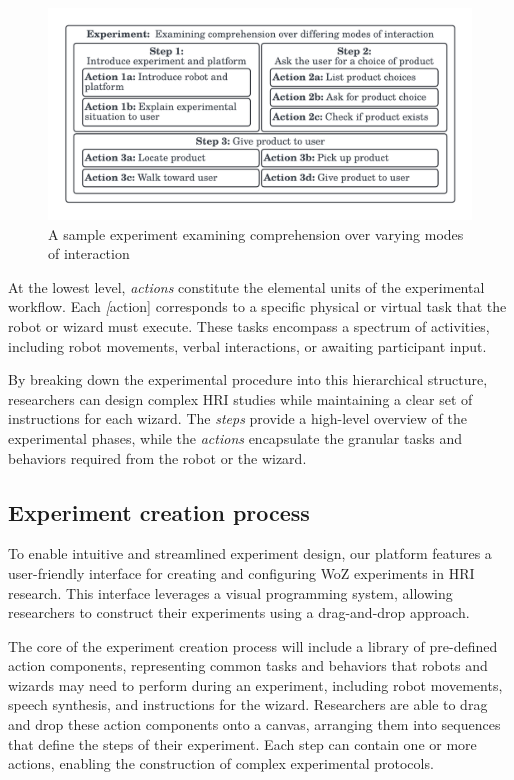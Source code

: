 \documentclass[letterpaper, 10 pt, conference]{ieeeconf}
\begin{document}
\begin{figure}[ht]
   \vskip -0.3cm
    \begin{center}
        \includegraphics[width=0.4\paperwidth]{assets/diagrams/experimentalarchitecture}
        \vskip -0.5cm
        \caption{A sample experiment examining comprehension over varying modes of interaction}
        \label{experimentalarchitecture}
    \end{center}
\vskip -0.3cm
\end{figure}

At the lowest level, \textit{actions} constitute the elemental units of the experimental workflow. Each \textit[action] corresponds to a specific physical or virtual task that the robot or wizard must execute. These tasks encompass a spectrum of activities, including robot movements, verbal interactions, or awaiting participant input.

By breaking down the experimental procedure into this hierarchical structure, researchers can design complex HRI studies while maintaining a clear set of instructions for each wizard. The \textit{steps} provide a high-level overview of the experimental phases, while the \textit{actions} encapsulate the granular tasks and behaviors required from the robot or the wizard.

\subsection{Experiment creation process}

To enable intuitive and streamlined experiment design, our platform features a user-friendly interface for creating and configuring WoZ experiments in HRI research. This interface leverages a visual programming system, allowing researchers to construct their experiments using a drag-and-drop approach.

The core of the experiment creation process will include a library of pre-defined action components, representing common tasks and behaviors that robots and wizards may need to perform during an experiment, including robot movements, speech synthesis, and instructions for the wizard. Researchers are able to drag and drop these action components onto a canvas, arranging them into sequences that define the steps of their experiment. Each step can contain one or more actions, enabling the construction of complex experimental protocols.
\end{document}
